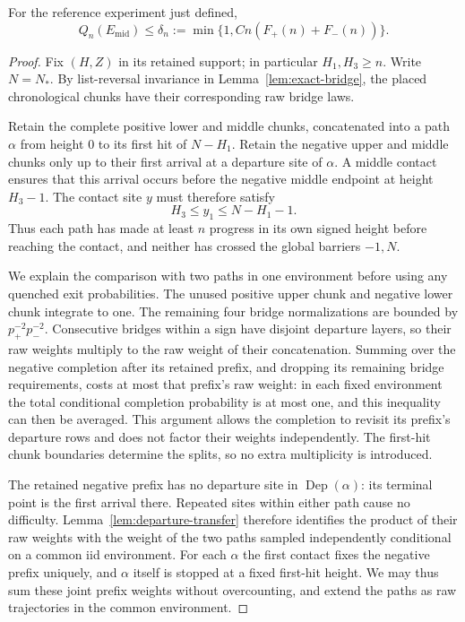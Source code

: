 \begin{lemma}\label{lem:reference-contact}
For the reference experiment just defined,
\[
 Q_n(E_{\mathrm{mid}})
 \le\delta_n:=\min\{1,Cn(F_+(n)+F_-(n))\}.
\]
\end{lemma}
\begin{proof}
Fix $(H,Z)$ in its retained support; in particular $H_1,H_3\ge n$.
Write $N=N_*$.  By list-reversal invariance in
Lemma~\ref{lem:exact-bridge}, the placed chronological chunks have
their corresponding raw bridge laws.

Retain the complete positive lower and middle chunks, concatenated
into a path $\alpha$ from height $0$ to its first hit of $N-H_1$.
Retain the negative upper and middle chunks only up to their first
arrival at a departure site of $\alpha$.  A middle contact ensures
that this arrival occurs before the negative middle endpoint at
height $H_3-1$.  The contact site $y$ must therefore satisfy
\begin{equation}\label{eq:reference-contact-height}
 H_3\le y_1\le N-H_1-1.
\end{equation}
Thus each path has made at least $n$ progress in its own signed height
before reaching the contact, and neither has crossed the global
barriers $-1,N$.

We explain the comparison with two paths in one environment before
using any quenched exit probabilities.  The unused positive upper
chunk and negative lower chunk integrate to one.  The remaining four
bridge normalizations are bounded by $p_+^{-2}p_-^{-2}$.  Consecutive
bridges within a sign have disjoint departure layers, so their raw
weights multiply to the raw weight of their concatenation.  Summing
over the negative completion after its retained prefix, and dropping
its remaining bridge requirements, costs at most that prefix's raw
weight: in each fixed environment the total conditional completion
probability is at most one, and this inequality can then be averaged.
This argument allows the completion to revisit its prefix's departure
rows and does not factor their weights independently.
The first-hit chunk boundaries determine the splits, so no
extra multiplicity is introduced.

The retained negative prefix has no departure site in
$\operatorname{Dep}(\alpha)$: its terminal point is the first arrival
there.  Repeated sites within either path cause no difficulty.
Lemma~\ref{lem:departure-transfer} therefore identifies the product
of their raw weights with the weight of the two paths sampled
independently conditional on a common iid environment.  For each
$\alpha$ the first contact fixes the negative prefix uniquely, and
$\alpha$ itself is stopped at a fixed first-hit height.  We may thus
sum these joint prefix weights without overcounting, and extend the
paths as raw trajectories in the common environment.


\end{proof}
